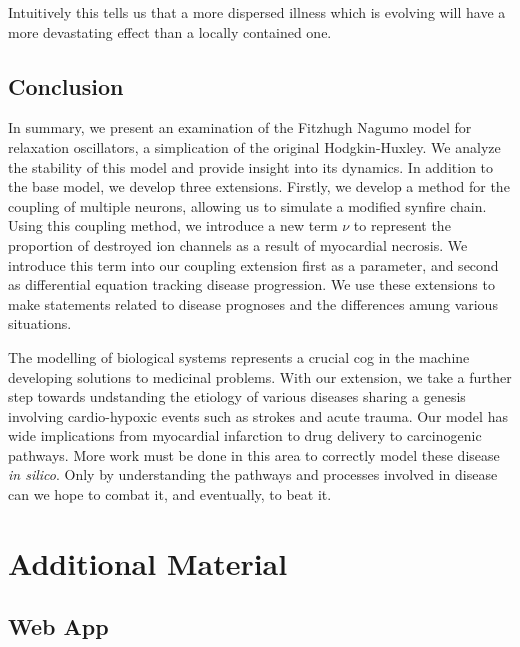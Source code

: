 \documentclass[11pt]{report}
\begin{document}
Intuitively this tells us that a more dispersed illness which is evolving will have a more devastating effect than a locally contained one. 

\section{Conclusion} %
\label{sec:conclusion}


In summary, we present an examination of the Fitzhugh Nagumo model for relaxation oscillators, a simplication of the original Hodgkin-Huxley. We analyze the stability of this model and provide insight into its dynamics. In addition to the base model, we develop three extensions. Firstly, we develop a method for the coupling of multiple  neurons, allowing us to simulate a modified synfire chain. Using this coupling method, we introduce a new term $\nu$ to represent the proportion of destroyed ion channels as a result of myocardial necrosis. We introduce this term into our coupling extension first as a parameter, and second as differential equation tracking disease progression. We use these extensions to make statements related to disease prognoses and the differences amung various situations. 

The modelling of biological systems represents a crucial cog in the machine developing solutions to medicinal problems. With our extension, we take a further step towards undstanding the etiology of various diseases sharing a genesis involving cardio-hypoxic events such as strokes and acute trauma. Our model has wide implications from myocardial infarction to drug delivery to carcinogenic pathways. More work must be done in this area to correctly model these disease \textit{in silico}. Only by understanding the pathways and processes involved in disease can we hope to combat it, and eventually, to beat it.  



\chapter{Additional Material} %
\label{sub:web_app}


\section{Web App} %
\label{sec:web_app}

\end{document}
